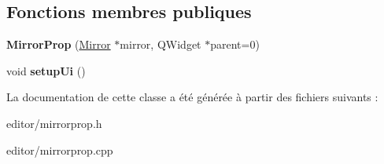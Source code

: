 \subsection*{Fonctions membres publiques}
\begin{DoxyCompactItemize}
\item 
\hypertarget{classMirrorProp_a66f3827e136a4de797881f58e3b2c2f5}{{\bfseries Mirror\+Prop} (\hyperlink{classMirror}{Mirror} $\ast$mirror, Q\+Widget $\ast$parent=0)}\label{classMirrorProp_a66f3827e136a4de797881f58e3b2c2f5}

\item 
\hypertarget{classMirrorProp_a78eb9900a2efb1ac16bae7956d21ac65}{void {\bfseries setup\+Ui} ()}\label{classMirrorProp_a78eb9900a2efb1ac16bae7956d21ac65}

\end{DoxyCompactItemize}


La documentation de cette classe a été générée à partir des fichiers suivants \+:\begin{DoxyCompactItemize}
\item 
editor/mirrorprop.\+h\item 
editor/mirrorprop.\+cpp\end{DoxyCompactItemize}
